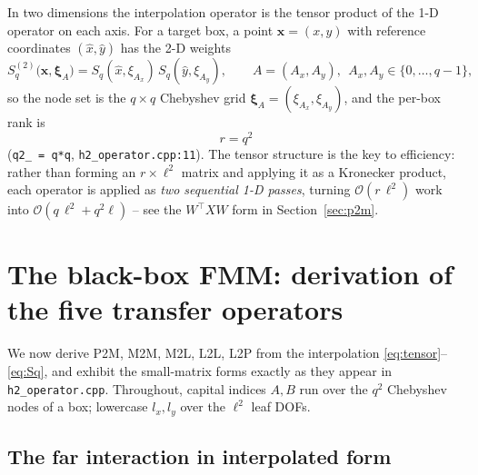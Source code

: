 \documentclass[11pt,a4paper]{article}
\newcommand{\Order}{\mathcal{O}}
\newcommand{\xx}{\mathbf{x}}
\newcommand{\code}[1]{\texttt{#1}}
\theoremstyle{definition}
\theoremstyle{remark}
\begin{document}
In two dimensions the interpolation operator is the tensor product of the 1-D
operator on each axis. For a target box, a point $\xx=(x,y)$ with reference
coordinates $(\hat x,\hat y)$ has the 2-D weights
\begin{equation}
  S_q^{(2)}\big(\xx,\boldsymbol\xi_A\big)
  = S_q(\hat x,\xi_{A_x})\,S_q(\hat y,\xi_{A_y}),
  \qquad A=(A_x,A_y),\ \ A_x,A_y\in\{0,\dots,q-1\},
  \label{eq:tensor}
\end{equation}
so the node set is the $q\times q$ Chebyshev grid $\boldsymbol\xi_A=(\xi_{A_x},
\xi_{A_y})$, and the per-box rank is
\begin{equation}
  r = q^2
\end{equation}
(\code{q2\_ = q*q}, \code{h2\_operator.cpp:11}). The tensor structure is the key
to efficiency: rather than forming an $r\times\ell^2$ matrix and applying it as a
Kronecker product, each operator is applied as \emph{two sequential 1-D passes},
turning $\Order(r\,\ell^2)$ work into $\Order(q\,\ell^2 + q^2\ell)$ -- see the
$W^\top X W$ form in Section~\ref{sec:p2m}.

\section{The black-box FMM: derivation of the five transfer operators}
\label{sec:bbfmm}

We now derive P2M, M2M, M2L, L2L, L2P from the interpolation
\eqref{eq:tensor}--\eqref{eq:Sq}, and exhibit the small-matrix forms exactly as
they appear in \code{h2\_operator.cpp}. Throughout, capital indices $A,B$ run over
the $q^2$ Chebyshev nodes of a box; lowercase $l_x,l_y$ over the $\ell^2$ leaf
DOFs.

\subsection{The far interaction in interpolated form}
\end{document}
